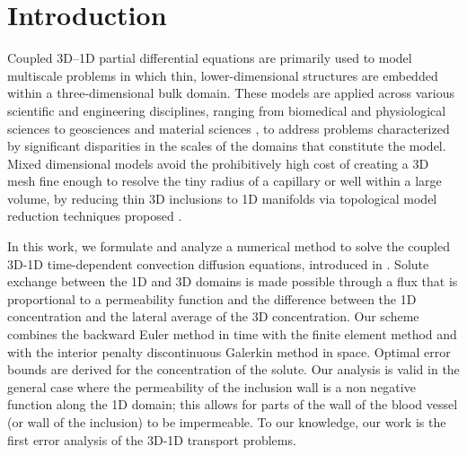 \documentclass[pdflatex,sn-mathphys-num]{sn-jnl}%
\theoremstyle{thmstyleone}%
\theoremstyle{thmstyletwo}%
\theoremstyle{thmstylethree}%
\begin{document}
\section{Introduction}\label{sec1}



 Coupled 3D–1D partial differential equations are primarily used to model multiscale problems in which  thin, lower-dimensional structures are embedded within a three-dimensional bulk domain. These models are applied across various scientific and engineering disciplines, ranging from biomedical and physiological sciences \cite{cattaneo2014computational, notaro2016method,koppl20203d,fritz20221d} to geosciences and material sciences \cite{gjerde2020singularity, malenica2018groundwater,cerroni2019mathematical,gjerde2018well,llau2016concrete}, to address problems characterized by significant disparities in the scales of the domains that constitute the model.
Mixed dimensional models avoid the prohibitively high cost of creating a 3D mesh fine enough to resolve the tiny radius of a capillary or well within a large volume, by reducing thin 3D inclusions to 1D manifolds via topological model reduction techniques proposed \cite{dAngelo2008coupling,Zunino19}.




In this work, we formulate and analyze a numerical method to solve the coupled 3D-1D time-dependent convection diffusion equations, introduced in \cite{masri2024modelling}. Solute exchange between the 1D and 3D domains is made possible through a flux that is proportional to a permeability function and the difference between the
1D concentration and the lateral average of the 3D concentration.  Our scheme combines the backward Euler method in time with the finite element method and with the interior penalty discontinuous Galerkin method in space. Optimal error bounds are derived for the concentration of the solute.
Our analysis is valid in the general case where the permeability of the inclusion wall is a non negative function along the 1D domain; this allows for parts of the wall of the blood vessel  (or wall of the inclusion) to be impermeable. To our knowledge, our work is the first error analysis of the 3D-1D transport problems. 
\end{document}
